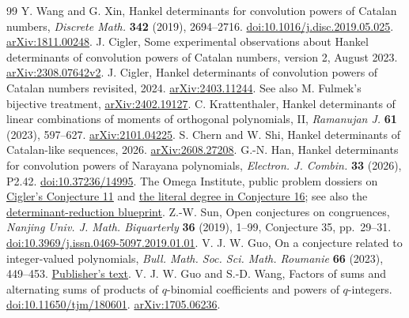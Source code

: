 \documentclass[11pt,a4paper]{article}
\theoremstyle{definition}\newtheorem{problem}[theorem]{Auxiliary problem}
\theoremstyle{remark}\newtheorem*{remark}{Remark}
\begin{document}
\begingroup\small
\begin{thebibliography}{99}
\setlength{\itemsep}{2pt}\setlength{\parsep}{0pt}
 Y. Wang and G. Xin, Hankel determinants for convolution powers of Catalan numbers, \emph{Discrete Math.} \textbf{342} (2019), 2694--2716. \href{https://doi.org/10.1016/j.disc.2019.05.025}{doi:10.1016/j.disc.2019.05.025}. \href{https://arxiv.org/abs/1811.00248}{arXiv:1811.00248}.
 J. Cigler, Some experimental observations about Hankel determinants of convolution powers of Catalan numbers, version 2, August 2023. \href{https://arxiv.org/abs/2308.07642v2}{arXiv:2308.07642v2}.
 J. Cigler, Hankel determinants of convolution powers of Catalan numbers revisited, 2024. \href{https://arxiv.org/abs/2403.11244}{arXiv:2403.11244}. See also M. Fulmek's bijective treatment, \href{https://arxiv.org/abs/2402.19127}{arXiv:2402.19127}.
 C. Krattenthaler, Hankel determinants of linear combinations of moments of orthogonal polynomials, II, \emph{Ramanujan J.} \textbf{61} (2023), 597--627. \href{https://arxiv.org/abs/2101.04225}{arXiv:2101.04225}.
 S. Chern and W. Shi, Hankel determinants of Catalan-like sequences, 2026. \href{https://arxiv.org/abs/2608.27208}{arXiv:2608.27208}. G.-N. Han, Hankel determinants for convolution powers of Narayana polynomials, \emph{Electron. J. Combin.} \textbf{33} (2026), P2.42. \href{https://doi.org/10.37236/14995}{doi:10.37236/14995}.
 The Omega Institute, public problem dossiers on \href{https://www.trureturing.org/research/cigler-catalan-power-shifted-hankel/}{Cigler's Conjecture 11} and \href{https://www.trureturing.org/research/cigler-sixteen-literal-numerator-degree/}{the literal degree in Conjecture 16}; see also the \href{https://the-omega-institute.github.io/trureturing-mdbook/Blueprint/D5/S3/Combinatorics/CatalanPowerHankel/CiglerEleven.html}{determinant-reduction blueprint}.
 Z.-W. Sun, Open conjectures on congruences, \emph{Nanjing Univ. J. Math. Biquarterly} \textbf{36} (2019), 1--99, Conjecture 35, pp.~29--31. \href{https://doi.org/10.3969/j.issn.0469-5097.2019.01.01}{doi:10.3969/j.issn.0469-5097.2019.01.01}.
 V. J. W. Guo, On a conjecture related to integer-valued polynomials, \emph{Bull. Math. Soc. Sci. Math. Roumanie} \textbf{66} (2023), 449--453. \href{https://ssmr.ro/bulletin/pdf/66-4/articol_8.pdf}{Publisher's text}.
 V. J. W. Guo and S.-D. Wang, Factors of sums and alternating sums of products of $q$-binomial coefficients and powers of $q$-integers. \href{https://doi.org/10.11650/tjm/180601}{doi:10.11650/tjm/180601}. \href{https://arxiv.org/abs/1705.06236}{arXiv:1705.06236}.

\end{thebibliography}
\end{document}
